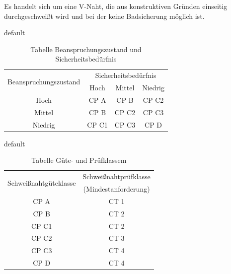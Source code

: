 \documentclass[11pt,a4paper,addpoints]{exam}
\begin{document}
\begin{questions}
Es handelt sich um eine V-Naht, die aus konstruktiven Gr\"unden einseitig durchgeschwei{\ss}t wird und bei der keine Badsicherung m\"oglich ist.

\begin{table}[htdp]
\caption{default}
\begin{center}
\begin{tabular}{|c|c |c |c |}
\hline
\multirow{2}{*}{Beanspruchungszustand} & \multicolumn{3}{|c|}{Sicherheitsbed\"urfnis} \\ \cline{2-4}
 & Hoch & Mittel & Niedrig \\ \hline
Hoch & CP A & CP B & CP C2 \\ \hline
Mittel & CP B & CP C2 & CP C3 \\ \hline
Niedrig & CP C1 & CP C3 & CP D \\ \hline 
\end{tabular}
\caption{Tabelle Beanspruchungszustand und Sicherheitsbed\"urfnis}
\end{center}
\label{default}
\end{table}%

\begin{table}[htdp]
\caption{default}
\begin{center}
\begin{tabular}{|c|c|}
\hline
\multirow{2}{*}{Schwei{\ss}nahtg\"uteklasse} & Schwei{\ss}nahtpr\"ufklasse \\
& (Mindestanforderung) \\ \hline 
 CP A & CT 1 \\ \hline
 CP B & CT 2 \\ \hline
 CP C1 & CT 2 \\ \hline
 CP C2 & CT 3 \\ \hline
 CP C3 & CT 4 \\ \hline
 CP D & CT 4 \\ \hline
\end{tabular}
\caption{Tabelle G\"ute- und Pr\"ufklassem}
\end{center}
\label{default}
\end{table}%

\newpage
\end{questions}
\end{document}
